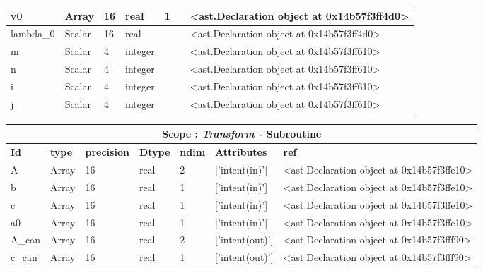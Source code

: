 \documentclass{report}
\begin{document}
\begin{center}
\begin{longtable}{|p{3.5cm}|p{1.5cm}|p{1.5cm}|p{1.5cm}|p{1cm}|p{2cm}|p{4cm}| }
v0 & Array & 16 & real & 1 &  & <ast.Declaration object at 0x14b57f3ff4d0> \\\hline

lambda\_0 & Scalar & 16 & real &  &  & <ast.Declaration object at 0x14b57f3ff4d0> \\\hline

m & Scalar & 4 & integer &  &  & <ast.Declaration object at 0x14b57f3ff610> \\\hline

n & Scalar & 4 & integer &  &  & <ast.Declaration object at 0x14b57f3ff610> \\\hline

i & Scalar & 4 & integer &  &  & <ast.Declaration object at 0x14b57f3ff610> \\\hline

j & Scalar & 4 & integer &  &  & <ast.Declaration object at 0x14b57f3ff610> \\\hline

\end{longtable}
\end{center}

 \vspace{1cm}

\begin{center}
\begin{longtable}{|p{3.5cm}|p{1.5cm}|p{1.5cm}|p{1.5cm}|p{1cm}|p{2cm}|p{4cm}| }
\hline
\multicolumn{7}{|c|}{\textbf{Scope : \qquad}  \textbf{\textit{Transform - }Subroutine}}\\ 
\hline
\textbf{Id} & \textbf{type} & \textbf{precision} & \textbf{Dtype} & \textbf{ndim} & \textbf{Attributes} & \textbf{ref} \\\hline

A & Array & 16 & real & 2 & ['intent(in)'] & <ast.Declaration object at 0x14b57f3ffe10> \\\hline

b & Array & 16 & real & 1 & ['intent(in)'] & <ast.Declaration object at 0x14b57f3ffe10> \\\hline

c & Array & 16 & real & 1 & ['intent(in)'] & <ast.Declaration object at 0x14b57f3ffe10> \\\hline

a0 & Array & 16 & real & 1 & ['intent(in)'] & <ast.Declaration object at 0x14b57f3ffe10> \\\hline

A\_can & Array & 16 & real & 2 & ['intent(out)'] & <ast.Declaration object at 0x14b57f3fff90> \\\hline

c\_can & Array & 16 & real & 1 & ['intent(out)'] & <ast.Declaration object at 0x14b57f3fff90> \\\hline

\end{longtable}
\end{center}
\end{document}

